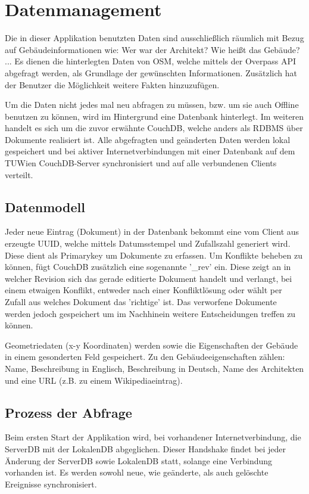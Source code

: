 \chapter{Datenmanagement}
\label{chap:datenmanagement}
Die in dieser Applikation benutzten Daten sind ausschließlich räumlich mit Bezug auf Gebäudeinformationen wie: Wer war der Architekt? Wie heißt das Gebäude? ...  
Es dienen die hinterlegten Daten von OSM, welche mittels der Overpass API abgefragt werden, als Grundlage der gewünschten Informationen. Zusätzlich hat der Benutzer die Möglichkeit weitere Fakten hinzuzufügen.

Um die Daten nicht jedes mal neu abfragen zu müssen, bzw. um sie auch Offline benutzen zu können, wird im Hintergrund eine Datenbank hinterlegt. Im weiteren handelt es sich um die zuvor erwähnte CouchDB, welche anders als RDBMS über Dokumente realisiert ist. Alle abgefragten und geänderten Daten werden lokal gespeichert und bei aktiver Internetverbindungen mit einer Datenbank auf dem TUWien CouchDB-Server synchronisiert und auf alle verbundenen Clients verteilt.

\section{Datenmodell}
\label{sec:datenmodel}
Jeder neue Eintrag (Dokument) in der Datenbank bekommt eine vom Client aus erzeugte UUID, welche mittels Datumsstempel und Zufallszahl generiert wird. Diese dient als Primarykey um Dokumente zu erfassen. 
Um Konflikte beheben zu können, fügt CouchDB zusätzlich eine sogenannte '_rev' ein. Diese zeigt an in welcher Revision sich das gerade editierte Dokument handelt und verlangt, bei einem etwaigen Konflikt, entweder nach einer Konfliktlösung oder wählt per Zufall aus welches Dokument das 'richtige' ist. Das verworfene Dokumente werden jedoch gespeichert um im Nachhinein weitere Entscheidungen treffen zu können.

Geometriedaten (x-y Koordinaten) werden sowie die Eigenschaften der Gebäude in einem gesonderten Feld gespeichert. Zu den Gebäudeeigenschaften zählen: Name, Beschreibung in Englisch, Beschreibung in Deutsch, Name des Architekten und eine URL (z.B. zu einem Wikipediaeintrag).


\section{Prozess der Abfrage}
\label{sec:abfrage}
Beim ersten Start der Applikation wird, bei vorhandener Internetverbindung, die ServerDB mit der LokalenDB abgeglichen. Dieser Handshake findet bei jeder Änderung der ServerDB sowie LokalenDB statt, solange eine Verbindung vorhanden ist. Es werden sowohl neue, wie geänderte, als auch gelöschte Ereignisse synchronisiert.

